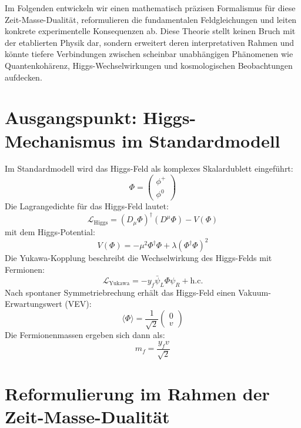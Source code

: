 \documentclass[a4paper,12pt]{article}
\begin{document}
	Im Folgenden entwickeln wir einen mathematisch präzisen Formalismus für diese Zeit-Masse-Dualität, reformulieren die fundamentalen Feldgleichungen und leiten konkrete experimentelle Konsequenzen ab. Diese Theorie stellt keinen Bruch mit der etablierten Physik dar, sondern erweitert deren interpretativen Rahmen und könnte tiefere Verbindungen zwischen scheinbar unabhängigen Phänomenen wie Quantenkohärenz, Higgs-Wechselwirkungen und kosmologischen Beobachtungen aufdecken.
	
	\section{Ausgangspunkt: Higgs-Mechanismus im Standardmodell}
	Im Standardmodell wird das Higgs-Feld als komplexes Skalardublett eingeführt:
	\begin{equation}
		\Phi = \begin{pmatrix} \phi^+ \\ \phi^0 \end{pmatrix}
	\end{equation}
	Die Lagrangedichte für das Higgs-Feld lautet:
	\begin{equation}
		\mathcal{L}_{\text{Higgs}} = (D_\mu \Phi)^\dagger (D^\mu \Phi) - V(\Phi)
	\end{equation}
	mit dem Higgs-Potential:
	\begin{equation}
		V(\Phi) = -\mu^2 \Phi^\dagger \Phi + \lambda (\Phi^\dagger \Phi)^2
	\end{equation}
	Die Yukawa-Kopplung beschreibt die Wechselwirkung des Higgs-Felds mit Fermionen:
	\begin{equation}
		\mathcal{L}_{\text{Yukawa}} = -y_f \bar{\psi}_L \Phi \psi_R + \text{h.c.}
	\end{equation}
	Nach spontaner Symmetriebrechung erhält das Higgs-Feld einen Vakuum-Erwartungswert (VEV):
	\begin{equation}
		\langle \Phi \rangle = \frac{1}{\sqrt{2}} \begin{pmatrix} 0 \\ v \end{pmatrix}
	\end{equation}
	Die Fermionenmassen ergeben sich dann als:
	\begin{equation}
		m_f = \frac{y_f v}{\sqrt{2}}
	\end{equation}
	
	\section{Reformulierung im Rahmen der Zeit-Masse-Dualität}
\end{document}
